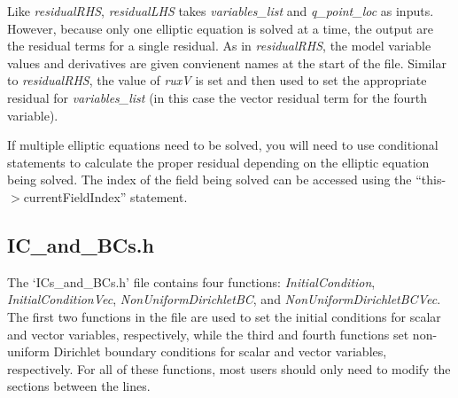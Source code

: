 \documentclass[10pt]{article} %
\begin{document}
Like \emph{residualRHS}, \emph{residualLHS} takes \emph{variables\_list} and  \emph{q\_point\_loc} as inputs. However, because only one elliptic equation is solved at a time, the output are the residual terms for a single residual. As in \emph{residualRHS}, the model variable values and derivatives are given convienent names at the start of the file. Similar to \emph{residualRHS}, the value of \emph{ruxV} is set and then used to set the appropriate residual for \emph{variables\_list} (in this case the vector residual term for the fourth variable).

If multiple elliptic equations need to be solved, you will need to use conditional statements to calculate the proper residual depending on the elliptic equation being solved. The index of the field being solved can be accessed using the ``this-$>$currentFieldIndex'' statement. 

\subsection{IC\_and\_BCs.h}
The `ICs\_and\_BCs.h' file contains four functions: \emph{InitialCondition}, \emph{InitialConditionVec}, \emph{NonUniformDirichletBC}, and \emph{NonUniformDirichletBCVec}. The first two functions in the file are used to set the initial conditions for scalar and vector variables, respectively, while the third and fourth functions set non-uniform Dirichlet boundary conditions for scalar and vector variables, respectively. For all of these functions, most users should only need to modify the sections between the lines.  
\end{document}
